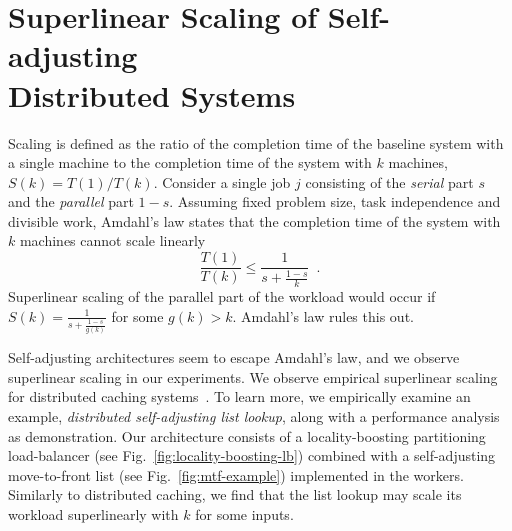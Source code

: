 \appendix



\section{Superlinear Scaling of Self-adjusting\\ Distributed Systems}
\label{sec:arch-scaling}


Scaling is defined as the ratio of the completion time of the baseline system with a single machine to the completion time of the system with $k$ machines, $S(k) = T(1) / T(k)$.
Consider a single job $j$ consisting of the \emph{serial} part $s$ and the \emph{parallel} part $1-s$.
Assuming fixed problem size, task independence and divisible work, Amdahl's law states that the completion time of the system with $k$ machines cannot scale linearly
\begin{equation*}\label{eq:mtf-perf}
  \frac{T(1)}{T(k)} \le \frac1{s + \frac{1-s}{k}} \enspace .
\end{equation*}
Superlinear scaling of the parallel part of the workload would occur if $S(k) = \frac1{s + \frac{1-s}{g(k)}}$ for some $g(k) > k$. Amdahl's law rules this out.


Self-adjusting architectures seem to escape Amdahl's law, and we observe superlinear scaling in our experiments.
We observe empirical superlinear scaling for distributed caching systems~\cite{271208, 10.5555/1012889.1012894, dobb-2}. To learn more, we empirically examine an example, \emph{distributed self-adjusting list lookup}, along with a performance analysis as demonstration. Our architecture consists of a locality-boosting partitioning load-balancer (see Fig.~\ref{fig:locality-boosting-lb}) combined with a self-adjusting move-to-front list (see Fig.~\ref{fig:mtf-example}) implemented in the workers.
Similarly to distributed caching, we find that the list lookup may scale its workload superlinearly with $k$ for some inputs.

